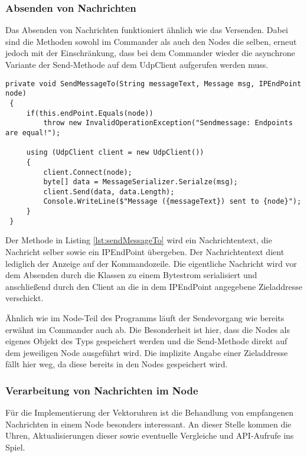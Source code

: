 \subsubsection{Absenden von Nachrichten}

Das Absenden von Nachrichten funktioniert ähnlich wie das Versenden. Dabei sind die Methoden sowohl im Commander als auch den Nodes die selben, erneut jedoch mit der Einschränkung, dass bei dem Commander wieder die asynchrone Variante der Send-Methode auf dem UdpClient aufgerufen werden muss. 

\begin{lstlisting}[label=lst:sendMessageTo,
language=sharpc,
float=ht,
firstnumber=1,
caption=Absenden einer Nachricht in einem Node.]
 private void SendMessageTo(String messageText, Message msg, IPEndPoint node)
 {
	 if(this.endPoint.Equals(node))
		 throw new InvalidOperationException("Sendmessage: Endpoints are equal!");
		 
	 using (UdpClient client = new UdpClient())
	 {
		 client.Connect(node);
		 byte[] data = MessageSerializer.Serialze(msg);
		 client.Send(data, data.Length);
		 Console.WriteLine($"Message ({messageText}) sent to {node}");
	 }
 }
\end{lstlisting}

Der Methode  in Listing \ref{lst:sendMessageTo} wird ein Nachrichtentext, die Nachricht selber sowie ein IPEndPoint übergeben. Der Nachrichtentext dient lediglich der Anzeige auf der Kommandozeile. Die eigentliche Nachricht wird vor dem Absenden durch die Klassen  zu einem Bytestrom serialisiert und anschließend durch den Client an die in dem IPEndPoint angegebene Zieladdresse verschickt.

Ähnlich wie im Node-Teil des Programms läuft der Sendevorgang wie bereits erwähnt im Commander auch ab. Die Besonderheit ist hier, dass die Nodes als eigenes Objekt des Typs  gespeichert werden und die Send-Methode direkt auf dem jeweiligen Node ausgeführt wird. Die implizite Angabe einer Zieladdresse fällt hier weg, da diese bereits in den Nodes gespeichert wird.
\subsubsection{Verarbeitung von Nachrichten im Node}
Für die Implementierung der Vektoruhren ist die Behandlung von empfangenen Nachrichten in einem Node besonders interessant. An dieser Stelle kommen die Uhren, Aktualisierungen dieser sowie eventuelle Vergleiche und API-Aufrufe ins Spiel. 

